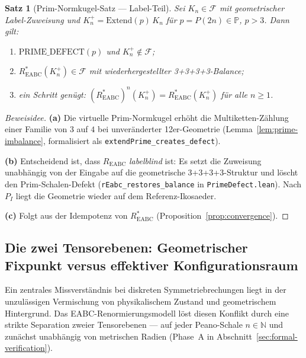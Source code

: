 \documentclass[11pt,a4paper]{article}
\newtheorem{theorem}{Satz}
\begin{document}
	\begin{theorem}[Prim-Normkugel-Satz — Label-Teil]
		\label{thm:prime-norm}
		Sei $K_n\in\mathcal{F}$ mit geometrischer Label-Zuweisung und
		$K_n^+=\mathrm{Extend}(p)\,K_n$ für $p=P(2n)\in\mathbb{P}$, $p>3$.
		Dann gilt:
		\begin{enumerate}
			\item[(a)] $\text{PRIME\_DEFECT}(p)$ und $K_n^+\notin\mathcal{F}$;
			\item[(b)] $R^*_{\mathrm{EABC}}(K_n^+)\in\mathcal{F}$ mit wiederhergestellter
			3+3+3+3-Balance;
			\item[(c)] ein Schritt genügt: $(R^*_{\mathrm{EABC}})^n(K_n^+)=R^*_{\mathrm{EABC}}(K_n^+)$
			für alle $n\ge 1$.
		\end{enumerate}
	\end{theorem}
	
	\begin{proof}[Beweisidee]
		\textbf{(a)} Die virtuelle Prim-Normkugel erhöht die Multiketten-Zählung einer
		Familie von $3$ auf $4$ bei unveränderter 12er-Geometrie
		(Lemma~\ref{lem:prime-imbalance}, formalisiert als
		\texttt{extendPrime\_creates\_defect}).
		
		\smallskip\noindent
		\textbf{(b)} Entscheidend ist, dass $R_{\mathrm{EABC}}$ \emph{labelblind} ist:
		Es setzt die Zuweisung unabhängig von der Eingabe auf die geometrische
		3+3+3+3-Struktur und löscht den Prim-Schalen-Defekt
		(\texttt{rEabc\_restores\_balance} in \texttt{PrimeDefect.lean}).
		Nach $P_I$ liegt die Geometrie wieder auf dem Referenz-Ikosaeder.
		
		\smallskip\noindent
		\textbf{(c)} Folgt aus der Idempotenz von $R^*_{\mathrm{EABC}}$
		(Proposition~\ref{prop:convergence}).
	\end{proof}
	
	\subsection{Die zwei Tensorebenen: Geometrischer Fixpunkt versus effektiver Konfigurationsraum}
	\label{sec:two-levels}
	
	Ein zentrales Missverständnis bei diskreten Symmetriebrechungen liegt in der
	unzulässigen Vermischung von physikalischem Zustand und geometrischem Hintergrund.
	Das EABC-Renormierungsmodell löst diesen Konflikt durch eine strikte Separation
	zweier Tensorebenen --- auf jeder Peano-Schale $n\in\mathbb{N}$ und zunächst
	unabhängig von metrischen Radien (Phase~A in Abschnitt~\ref{sec:formal-verification}).
	
\end{document}
